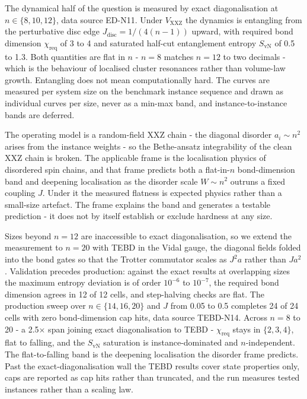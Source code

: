 The dynamical half of the question is measured by exact diagonalisation at $n \in \{8, 10, 12\}$, data source ED-N11. Under $V_{\mathrm{XXZ}}$ the dynamics is entangling from the perturbative disc edge $J_{\mathrm{disc}} = 1/(4(n-1))$ upward, with required bond dimension $\chi_{\mathrm{req}}$ of 3 to 4 and saturated half-cut entanglement entropy $S_{\mathrm{vN}}$ of 0.5 to 1.3. Both quantities are flat in $n$ - $n = 8$ matches $n = 12$ to two decimals - which is the behaviour of localised cluster resonances rather than volume-law growth. Entangling does not mean computationally hard. The curves are measured per system size on the benchmark instance sequence and drawn as individual curves per size, never as a min-max band, and instance-to-instance bands are deferred.

The operating model is a random-field XXZ chain - the diagonal disorder $a_i \sim n^{2}$ arises from the instance weights - so the Bethe-ansatz integrability of the clean XXZ chain is broken. The applicable frame is the localisation physics of disordered spin chains, and that frame predicts both a flat-in-$n$ bond-dimension band and deepening localisation as the disorder scale $W \sim n^{2}$ outruns a fixed coupling $J$. Under it the measured flatness is expected physics rather than a small-size artefact. The frame explains the band and generates a testable prediction - it does not by itself establish or exclude hardness at any size.

Sizes beyond $n = 12$ are inaccessible to exact diagonalisation, so we extend the measurement to $n = 20$ with TEBD in the Vidal gauge, the diagonal fields folded into the bond gates so that the Trotter commutator scales as $J^{2} a$ rather than $J a^{2}$. Validation precedes production: against the exact results at overlapping sizes the maximum entropy deviation is of order $10^{-6}$ to $10^{-7}$, the required bond dimension agrees in 12 of 12 cells, and step-halving checks are flat. The production sweep over $n \in \{14, 16, 20\}$ and $J$ from 0.05 to 0.5 completes 24 of 24 cells with zero bond-dimension cap hits, data source TEBD-N14. Across $n = 8$ to 20 - a 2.5$\times$ span joining exact diagonalisation to TEBD - $\chi_{\mathrm{req}}$ stays in $\{2, 3, 4\}$, flat to falling, and the $S_{\mathrm{vN}}$ saturation is instance-dominated and $n$-independent. The flat-to-falling band is the deepening localisation the disorder frame predicts. Past the exact-diagonalisation wall the TEBD results cover state properties only, caps are reported as cap hits rather than truncated, and the run measures tested instances rather than a scaling law.

